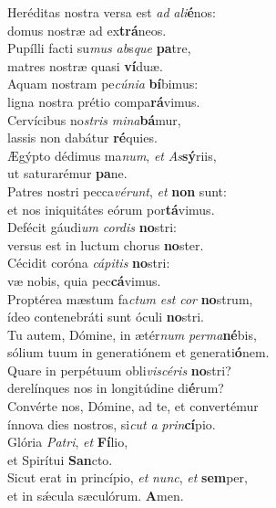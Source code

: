 \evenverse Heréditas nostra versa est \textit{ad} \textit{a}\textit{li}\textbf{é}nos:~\*\\
\evenverse domus nostræ ad ex\textbf{trá}neos.\\
\oddverse Pupílli facti su\textit{mus} \textit{ab}s\textit{que} \textbf{pa}tre,~\*\\
\oddverse matres nostræ quasi \textbf{ví}duæ.\\
\evenverse Aquam nostram pe\textit{cú}\textit{ni}\textit{a} \textbf{bí}bimus:~\*\\
\evenverse ligna nostra prétio compa\textbf{rá}vimus.\\
\oddverse Cervícibus no\textit{stris} \textit{mi}\textit{na}\textbf{bá}mur,~\*\\
\oddverse lassis non dabátur \textbf{ré}quies.\\
\evenverse Ægýpto dédimus ma\textit{num}, \textit{et} \textit{As}\textbf{sý}riis,~\*\\
\evenverse ut saturarémur \textbf{pa}ne.\\
\oddverse Patres nostri pecca\textit{vé}\textit{runt}, \textit{et} \textbf{non} sunt:~\*\\
\oddverse et nos iniquitátes eórum por\textbf{tá}vimus.\\
\evenverse Defécit gáudi\textit{um} \textit{cor}\textit{dis} \textbf{no}stri:~\*\\
\evenverse versus est in luctum chorus \textbf{no}ster.\\
\oddverse Cécidit coróna \textit{cá}\textit{pi}\textit{tis} \textbf{no}stri:~\*\\
\oddverse væ nobis, quia pec\textbf{cá}vimus.\\
\evenverse Proptérea mæstum fa\textit{ctum} \textit{est} \textit{cor} \textbf{no}strum,~\*\\
\evenverse ídeo contenebráti sunt óculi \textbf{no}stri.\\
\oddverse Tu autem, Dómine, in ætér\textit{num} \textit{per}\textit{ma}\textbf{né}bis,~\*\\
\oddverse sólium tuum in generatiónem et generati\textbf{ó}nem.\\
\evenverse Quare in perpétuum obli\textit{vi}\textit{scé}\textit{ris} \textbf{no}stri?~\*\\
\evenverse derelínques nos in longitúdine di\textbf{é}rum?\\
\oddverse Convérte nos, Dómine, ad te, et convertémur~\*\\
\oddverse ínnova dies nostros, si\textit{cut} \textit{a} \textit{prin}\textbf{cí}pio.\\
\evenverse Glória \textit{Pa}\textit{tri}, \textit{et} \textbf{Fí}lio,~\*\\
\evenverse et Spirítui \textbf{San}cto.\\
\oddverse Sicut erat in princípio, \textit{et} \textit{nunc}, \textit{et} \textbf{sem}per,~\*\\
\oddverse et in sǽcula sæculórum. \textbf{A}men.\\
